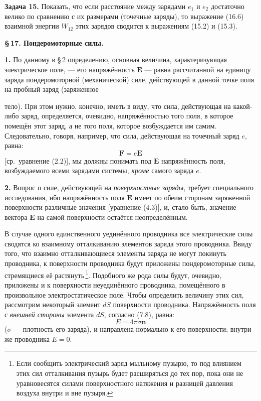 \documentclass[a4paper,10pt]{article}
\begin{document}
\textbf{Задача 15.} Показать, что если расстояние между зарядами $e_1$
и $e_2$ достаточно велико по сравнению с их размерами (точечные заряды),
то выражение (16.6) взаимной энергии $W_{12}$ этих зарядов сводится
к выражениям (15.2) и (15.3).

\bigskip
\noindent\textbf{\S\,17. Пондеромоторные силы.}

\medskip
\textbf{1.} По данному в §\,2 определению, основная величина,
характеризующая электрическое поле, — его напряжённость $\mathbf{E}$ —
равна рассчитанной на единицу заряда пондеромоторной (механической)
силе, действующей в данной точке поля на пробный заряд (заряженное


тело). При этом нужно, конечно, иметь в виду, что сила, действующая
на какой-либо заряд, определяется, очевидно, напряжённостью того поля,
в которое помещён этот заряд, а не того поля, которое возбуждается им
самим. Следовательно, говоря, например, что сила, действующая на
точечный заряд $e$, равна:
\begin{equation}
    \mathbf{F} = e\mathbf{E}
    \tag{17.1}
\end{equation}
[ср.\ уравнение (2.2)], мы должны понимать под $\mathbf{E}$ напряжённость
поля, возбуждаемого всеми зарядами системы, \textit{кроме} самого
заряда $e$.

\textbf{2.} Вопрос о силе, действующей на \textit{поверхностные заряды},
требует специального исследования, ибо напряжённость поля $\mathbf{E}$
имеет по обеим сторонам заряженной поверхности различные значения
[уравнение (4.3)], и, стало быть, значение вектора $\mathbf{E}$ на самой
поверхности остаётся неопределённым.

В случае одного единственного уединённого проводника все электрические
силы сводятся ко взаимному отталкиванию элементов заряда этого
проводника. Ввиду того, что взаимно отталкивающиеся элементы заряда
не могут покинуть проводника, к поверхности проводника будут приложены
пондеромоторные силы, стремящиеся её растянуть\,\footnote{Если сообщить
электрический заряд мыльному пузырю, то под влиянием этих сил
отталкивания пузырь будет расширяться до тех пор, пока они не
уравновесятся силами поверхностного натяжения и разницей давления
воздуха внутри и вне пузыря.}. Подобного же рода силы будут, очевидно,
приложены и к поверхности неуединённого проводника, помещённого
в произвольное электростатическое поле. Чтобы определить величину этих
сил, рассмотрим некоторый элемент $dS$ поверхности проводника.
Напряжённость поля с \textit{внешней стороны} элемента $dS$, согласно
(7.8), равна:
$$
    E = 4\pi\sigma\mathbf{n}
$$
($\sigma$ — плотность его заряда), и направлена нормально к его
поверхности; внутри же проводника $E = 0$.
\end{document}
